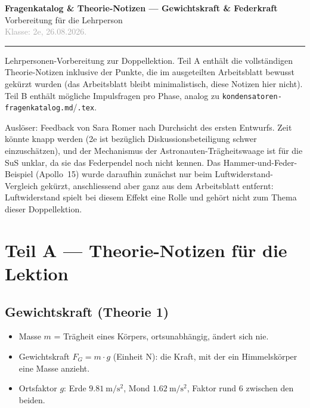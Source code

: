 \documentclass[11pt,a4paper]{article}
\begin{document}
{\Large\bfseries\color{titleblue} Fragenkatalog \& Theorie-Notizen --- Gewichtskraft \& Federkraft}\\[0.2em]
{\large\color{accentblue} Vorbereitung für die Lehrperson}\\[0.4em]
\textcolor{darkgray}{Klasse: 2e, 26.08.2026.}

\vspace{0.3em}
{\noindent\color{accentblue}\rule{\linewidth}{0.8pt}}
\vspace{0.5em}

Lehrpersonen-Vorbereitung zur Doppellektion. Teil A enthält die
vollständigen Theorie-Notizen inklusive der Punkte, die im ausgeteilten
Arbeitsblatt bewusst gekürzt wurden (das Arbeitsblatt bleibt minimalistisch,
diese Notizen hier nicht). Teil B enthält mögliche Impulsfragen pro Phase,
analog zu \texttt{kondensatoren-\allowbreak fragenkatalog.md}/\texttt{.tex}.

Auslöser: Feedback von Sara Romer nach Durchsicht des ersten Entwurfs. Zeit
könnte knapp werden (2e ist bezüglich Diskussionsbeteiligung schwer
einzuschätzen), und der Mechanismus der Astronauten-Trägheitswaage ist für
die SuS unklar, da sie das Federpendel noch nicht kennen. Das
Hammer-und-Feder-Beispiel (Apollo~15) wurde daraufhin zunächst nur beim
Luftwiderstand-Vergleich gekürzt, anschliessend aber ganz aus dem
Arbeitsblatt entfernt: Luftwiderstand spielt bei diesem Effekt eine Rolle
und gehört nicht zum Thema dieser Doppellektion.

\section*{Teil A --- Theorie-Notizen für die Lektion}

\subsection*{Gewichtskraft (Theorie 1)}

\begin{itemize}[leftmargin=1.2cm,itemsep=0.3em]
  \item Masse $m$ = Trägheit eines Körpers, ortsunabhängig, ändert sich nie.
  \item Gewichtskraft $F_G=m\cdot g$ (Einheit N): die Kraft, mit der ein
  Himmelskörper eine Masse anzieht.
  \item Ortsfaktor $g$: Erde $\SI{9.81}{\meter\per\second\squared}$, Mond
  $\SI{1.62}{\meter\per\second\squared}$, Faktor rund 6 zwischen den beiden.
\end{itemize}
\end{document}
